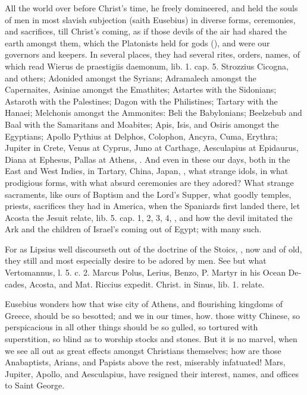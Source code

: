 {All the world over before Christ's time, he freely domineered, and held
the souls of men in most slavish subjection (saith Eusebius) in
diverse forms, ceremonies, and sacrifices, till Christ's coming, as if
those devils of the air had shared the earth amongst them, which the
Platonists held for gods (), and were our
governors and keepers. In several places, they had several rites,
orders, names, of which read Wierus \textlatin{de praestigiis daemonum, lib. 1.
cap. 5.} Strozzius Cicogna, and others; Adonided amongst the
Syrians; Adramalech amongst the Capernaites, Asiniae amongst the
Emathites; Astartes with the Sidonians; Astaroth with the Palestines;
Dagon with the Philistines; Tartary with the Hanaei; Melchonis amongst
the Ammonites: Beli the Babylonians; Beelzebub and Baal with the
Samaritans and Moabites; Apis, Isis, and Osiris amongst the Egyptians;
Apollo Pythius at Delphos, Colophon, Ancyra, Cuma, Erythra; Jupiter in
Crete, Venus at Cyprus, Juno at Carthage, Aesculapius at Epidaurus,
Diana at Ephesus, Pallas at Athens, \etc{}. And even in these our days,
both in the East and West Indies, in Tartary, China, Japan, \etc{}, what
strange idols, in what prodigious forms, with what absurd ceremonies
are they adored? What strange sacraments, like ours of Baptism and the
Lord's Supper, what goodly temples, priests, sacrifices they had in
America, when the Spaniards first landed there, let Acosta the Jesuit
relate, \textlatin{lib. 5. cap. 1, 2, 3, 4}, \etc{}, and how the devil imitated the
Ark and the children of Israel's coming out of Egypt; with many such.

For as Lipsius well discourseth out of the doctrine of the Stoics,
, now and of old, they still and most
especially desire to be adored by men. See but what Vertomannus, \textlatin{l. 5.
c. 2}. Marcus Polus, Lerius, Benzo, P. Martyr in his \textlatin{Ocean Decades},
Acosta, and Mat. Riccius \textlatin{expedit. Christ. in Sinus, lib. 1.} relate.

Eusebius wonders how that wise city of Athens, and flourishing
kingdoms of Greece, should be so besotted; and we in our times, how.
those witty Chinese, so perspicacious in all other things should be so
gulled, so tortured with superstition, so blind as to worship stocks
and stones. But it is no marvel, when we see all out as great effects
amongst Christians themselves; how are those Anabaptists, Arians, and
Papists above the rest, miserably infatuated! Mars, Jupiter, Apollo,
and Aesculapius, have resigned their interest, names, and offices to
Saint George.

}
